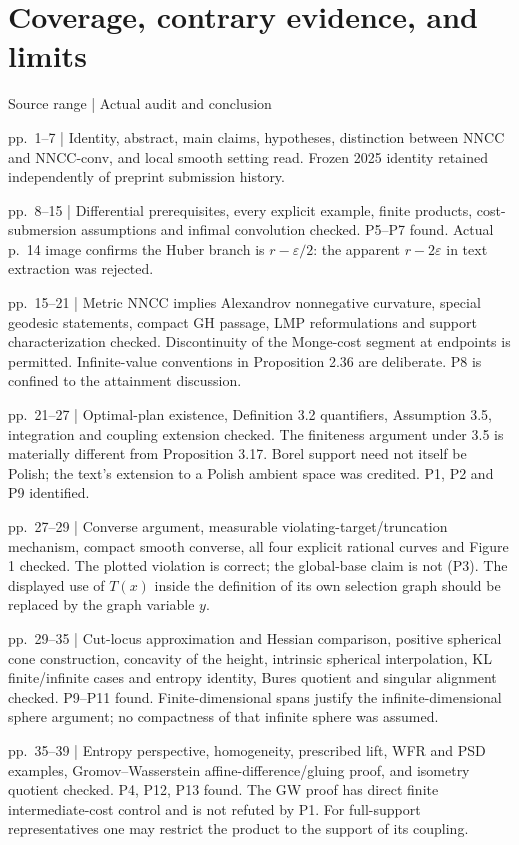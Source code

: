 \documentclass[10pt]{article}
\begin{document}
\section*{Coverage, contrary evidence, and limits}
Source range | Actual audit and conclusion\par
pp. 1–7 | Identity, abstract, main claims, hypotheses, distinction between NNCC and NNCC-conv, and local smooth setting read. Frozen 2025 identity retained independently of preprint submission history.\par
pp. 8–15 | Differential prerequisites, every explicit example, finite products, cost-submersion assumptions and infimal convolution checked. P5–P7 found. Actual p. 14 image confirms the Huber branch is \(r-\varepsilon/2\): the apparent \(r-2\varepsilon\) in text extraction was rejected.\par
pp. 15–21 | Metric NNCC implies Alexandrov nonnegative curvature, special geodesic statements, compact GH passage, LMP reformulations and support characterization checked. Discontinuity of the Monge-cost segment at endpoints is permitted. Infinite-value conventions in Proposition 2.36 are deliberate. P8 is confined to the attainment discussion.\par
pp. 21–27 | Optimal-plan existence, Definition 3.2 quantifiers, Assumption 3.5, integration and coupling extension checked. The finiteness argument under 3.5 is materially different from Proposition 3.17. Borel support need not itself be Polish; the text’s extension to a Polish ambient space was credited. P1, P2 and P9 identified.\par
pp. 27–29 | Converse argument, measurable violating-target/truncation mechanism, compact smooth converse, all four explicit rational curves and Figure 1 checked. The plotted violation is correct; the global-base claim is not (P3). The displayed use of \(T(x)\) inside the definition of its own selection graph should be replaced by the graph variable \(y\).\par
pp. 29–35 | Cut-locus approximation and Hessian comparison, positive spherical cone construction, concavity of the height, intrinsic spherical interpolation, KL finite/infinite cases and entropy identity, Bures quotient and singular alignment checked. P9–P11 found. Finite-dimensional spans justify the infinite-dimensional sphere argument; no compactness of that infinite sphere was assumed.\par
pp. 35–39 | Entropy perspective, homogeneity, prescribed lift, WFR and PSD examples, Gromov–Wasserstein affine-difference/gluing proof, and isometry quotient checked. P4, P12, P13 found. The GW proof has direct finite intermediate-cost control and is not refuted by P1. For full-support representatives one may restrict the product to the support of its coupling.\par
\end{document}
